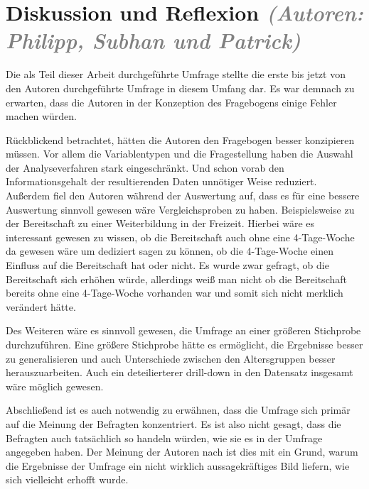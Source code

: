 \chapter{Diskussion und Reflexion \textit{\textcolor{gray}{(Autoren: Philipp, Subhan und Patrick)}}}


Die als Teil dieser Arbeit durchgeführte Umfrage stellte die erste bis jetzt von den Autoren durchgeführte
Umfrage in diesem Umfang dar. Es war demnach zu erwarten, dass die Autoren in der Konzeption des Fragebogens
einige Fehler machen würden. 

Rückblickend betrachtet, hätten die Autoren den Fragebogen besser konzipieren müssen.
Vor allem die Variablentypen und die Fragestellung haben die Auswahl der Analyseverfahren stark eingeschränkt. Und schon
vorab den Informationsgehalt der resultierenden Daten unnötiger Weise reduziert.
Außerdem fiel den Autoren während der Auswertung auf, dass es für eine bessere Auswertung sinnvoll gewesen wäre 
Vergleichsproben zu haben. Beispielsweise zu der Bereitschaft zu einer Weiterbildung in der Freizeit. 
Hierbei wäre es interessant gewesen zu wissen, ob die Bereitschaft auch ohne eine 4-Tage-Woche da gewesen 
wäre um dediziert sagen zu können, ob die 4-Tage-Woche einen Einfluss auf die Bereitschaft hat oder nicht.
Es wurde zwar gefragt, ob die Bereitschaft sich erhöhen würde, allerdings weiß man nicht
ob die Bereitschaft bereits ohne eine 4-Tage-Woche vorhanden war und somit sich nicht merklich verändert hätte.

Des Weiteren wäre es sinnvoll gewesen, die Umfrage an einer größeren Stichprobe durchzuführen. Eine größere Stichprobe
hätte es ermöglicht, die Ergebnisse besser zu generalisieren und auch Unterschiede zwischen den Altersgruppen besser
herauszuarbeiten. Auch ein deteilierterer drill-down in den Datensatz insgesamt wäre möglich gewesen.

Abschließend ist es auch notwendig zu erwähnen, dass die Umfrage sich primär auf die Meinung der Befragten konzentriert.
Es ist also nicht gesagt, dass die Befragten auch tatsächlich so handeln würden, wie sie es in der Umfrage angegeben haben.
Der Meinung der Autoren nach ist dies mit ein Grund, warum die Ergebnisse der Umfrage ein nicht wirklich aussagekräftiges Bild 
liefern, wie sich vielleicht erhofft wurde.

